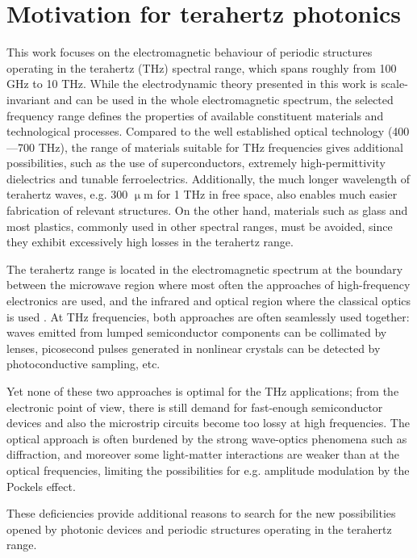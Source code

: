 \section{Motivation for terahertz photonics} %
This work focuses on the electromagnetic behaviour of periodic structures operating in the terahertz (THz) spectral range, which spans roughly from 100 GHz to 10 THz. While the electrodynamic theory presented in this work is scale-invariant and can be used in the whole electromagnetic spectrum, the selected frequency range defines the properties of available constituent materials and technological processes. Compared to the well established optical technology (400---700 THz), the range of materials suitable for THz frequencies gives additional possibilities, such as the use of superconductors, extremely high-permittivity dielectrics and tunable ferroelectrics. Additionally, the much longer wavelength of terahertz waves, e.g. 300 $\upmu$m for 1 THz in free space, also enables much easier fabrication of relevant structures. On the other hand, materials such as glass and most plastics, commonly used in other spectral ranges, must be avoided, since they exhibit excessively high losses in the terahertz range.

The terahertz range is located in the electromagnetic spectrum at the boundary between the microwave region where most often the approaches of high-frequency electronics are used, and the infrared and optical region where the classical optics is used \cite{ozyuzer2007emission}. At THz frequencies, both approaches are often seamlessly used together: waves emitted from lumped semiconductor components can be collimated by lenses, picosecond pulses generated in nonlinear crystals can be detected by photoconductive sampling, etc.  %

Yet none of these two approaches is optimal for the THz applications; from the electronic point of view, there is still demand for fast-enough semiconductor devices and also the microstrip circuits become too lossy at high frequencies. The optical approach is often burdened by the strong wave-optics phenomena such as diffraction, and moreover some light-matter interactions are weaker than at the optical frequencies, limiting the possibilities for e.g. amplitude modulation by the Pockels effect. 

These deficiencies provide additional reasons to search for the new possibilities opened by photonic devices and periodic structures operating in the terahertz range.  

